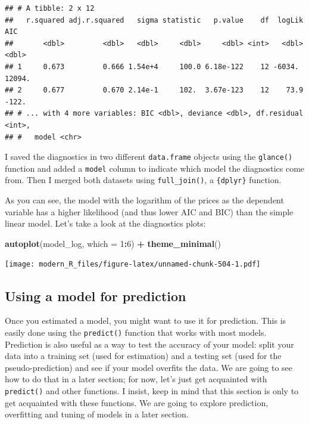 \documentclass[]{gitbook}
\newenvironment{Shaded}{\begin{snugshade}}{\end{snugshade}}
\newcommand{\DataTypeTok}[1]{\textcolor[rgb]{0.13,0.29,0.53}{#1}}
\newcommand{\DecValTok}[1]{\textcolor[rgb]{0.00,0.00,0.81}{#1}}
\newcommand{\KeywordTok}[1]{\textcolor[rgb]{0.13,0.29,0.53}{\textbf{#1}}}
\newcommand{\NormalTok}[1]{#1}
\newcommand{\OperatorTok}[1]{\textcolor[rgb]{0.81,0.36,0.00}{\textbf{#1}}}
\newcommand{\StringTok}[1]{\textcolor[rgb]{0.31,0.60,0.02}{#1}}
\begin{document}
\begin{verbatim}
## # A tibble: 2 x 12
##   r.squared adj.r.squared   sigma statistic   p.value    df  logLik     AIC
##       <dbl>         <dbl>   <dbl>     <dbl>     <dbl> <int>   <dbl>   <dbl>
## 1     0.673         0.666 1.54e+4     100.0 6.18e-122    12 -6034.   12094.
## 2     0.677         0.670 2.14e-1     102.  3.67e-123    12    73.9   -122.
## # ... with 4 more variables: BIC <dbl>, deviance <dbl>, df.residual <int>,
## #   model <chr>
\end{verbatim}

I saved the diagnostics in two different \texttt{data.frame} objects using the \texttt{glance()} function and added a
\texttt{model} column to indicate which model the diagnostics come from. Then I merged both datasets using
\texttt{full\_join()}, a \texttt{\{dplyr\}} function.

As you can see, the model with the logarithm of the prices as the dependent variable has a higher
likelihood (and thus lower AIC and BIC) than the simple linear model. Let's take a look at the
diagnostics plots:

\begin{Shaded}
\begin{Highlighting}[]
\KeywordTok{autoplot}\NormalTok{(model_log, }\DataTypeTok{which =} \DecValTok{1}\OperatorTok{:}\DecValTok{6}\NormalTok{) }\OperatorTok{+}\StringTok{ }\KeywordTok{theme_minimal}\NormalTok{()}
\end{Highlighting}
\end{Shaded}

\texttt{[image: modern\_R\_files/figure-latex/unnamed-chunk-504-1.pdf]}

\hypertarget{using-a-model-for-prediction}{%
\subsection{Using a model for prediction}\label{using-a-model-for-prediction}}

Once you estimated a model, you might want to use it for prediction. This is easily done using the
\texttt{predict()} function that works with most models. Prediction is also useful as a way to test the
accuracy of your model: split your data into a training set (used for estimation) and a testing
set (used for the pseudo-prediction) and see if your model overfits the data. We are going to see
how to do that in a later section; for now, let's just get acquainted with \texttt{predict()} and other
functions. I insist, keep in mind that this section is only to get acquainted with these functions.
We are going to explore prediction, overfitting and tuning of models in a later section.
\end{document}
